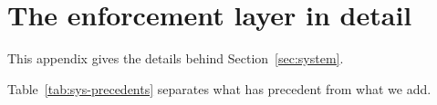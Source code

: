 
\section{The enforcement layer in detail}\label{app:system}

This appendix gives the details behind Section~\ref{sec:system}.

Table~\ref{tab:sys-precedents} separates what has precedent from what we add.

